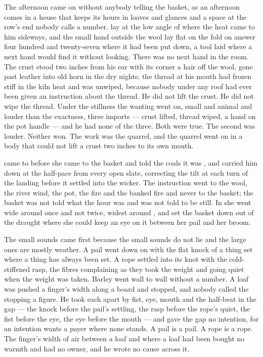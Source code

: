 The afternoon came on without anybody telling the basket, as an afternoon comes in a house that keeps its hours in loaves and glances and a space at the row's end nobody calls a number.  lay at the low angle of  where the heat came to him sideways, and the small hand outside the wool lay flat on the fold on answer four hundred and twenty-seven where it had been put down, a tool laid where a next hand would find it without looking. There was no next hand in the room. The crust stood two inches from his ear with its corner a hair off the wool, gone past leather into old horn in the dry nights; the thread at his mouth had frozen stiff in the kiln heat and was unwiped, because nobody under any roof had ever been given an instruction about the thread. He did not lift the crust. He did not wipe the thread. Under the stillness the wanting went on, small and animal and louder than the exactness, three imports --- crust lifted, thread wiped, a hand on the pot handle --- and he had none of the three. Both were true. The second was louder. Neither won. The work was the quarrel, and the quarrel went on in a body that could not lift a crust two inches to its own mouth.

 came to  before she came to the basket and told the coals it was , and carried him down  at the half-pace from every open slate, correcting the tilt at each turn of the landing before it settled into the wicker. The instruction went to the wool, the river wind, the pot, the fire and the banked fire and never to the basket; the basket was not told what the hour was and was not told to be still. In  she went wide around  once and not twice, widest around , and set the basket down out of the draught where she could keep an eye on it between her pail and her broom.

\scenebreak

The small sounds came first because the small sounds do not lie and the large ones are mostly weather. A pail went down on  with the flat knock of a thing set where a thing has always been set. A rope settled into its knot with the cold-stiffened rasp, the fibres complaining as they took the weight and going quiet when the weight was taken. Barley went wall to wall without a number. A loaf was pushed a finger's width along a board and stopped, and nobody called the stopping a figure. He took each apart by fist, eye, mouth and the half-beat in the gap --- the knock before the pail's settling, the rasp before the rope's quiet, the fist before the eye, the eye before the mouth --- and gave the gap no intention, for an intention wants a payer where none stands. A pail is a pail. A rope is a rope. The finger's width of air between a loaf and where a loaf had been bought no warmth and had no owner, and he wrote no cause across it.

